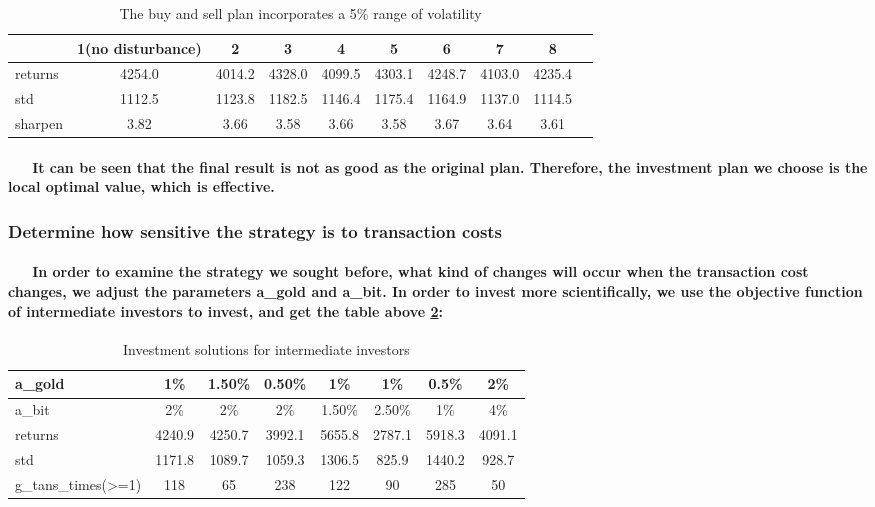\documentclass{mcmthesis}
\begin{document}
	\begin{table}[H]
		\centering
		\caption{The buy and sell plan incorporates a 5\% range of volatility}\label{t2}
		\begin{tabular}{|l|c|c|c|c|c|c|c|c|c|}
			\hline
			\  & 1(no disturbance) & 2	 &	 3 	&4		 & 			5& 		6 & 7	 & 8	 \\
			\hline
			returns & 4254.0 	& 4014.2 & 4328.0 & 4099.5 & 4303.1 &	4248.7& 4103.0 & 4235.4 \\
			\hline
			std		 & 1112.5 	& 1123.8 & 1182.5 & 1146.4 & 1175.4 & 1164.9 & 1137.0 & 1114.5 \\
			\hline
			sharpen & 3.82 	& 3.66		&3.58		&3.66	& 3.58	& 3.67	& 3.64	& 3.61	 \\
			\hline
		\end{tabular}
	\end{table}
	
	\paragraph{
		\ \ \ It can be seen that the final result is not as good as the original plan. Therefore, the investment plan we choose is the local optimal value, which is effective.
	}
	
	\subsubsection{Determine how sensitive the strategy is to transaction costs}
	
	\paragraph{
		\ \ \ In order to examine the strategy we sought before, what kind of changes will occur when the transaction cost changes, we adjust the parameters a\_gold and a\_bit. In order to invest more scientifically, we use the objective function of intermediate investors to invest, and get the table above \ref{t3}: 
	}
	
	\begin{table}[H]
		\centering
		\caption{Investment solutions for intermediate investors}\label{t3}
		\begin{tabular}{|l|c|c|c|c|c|c|c|}
			\hline
			a\_gold  & 1\% & 1.50\%	 &	0.50\% 	&1\%		&  1\% &	0.5\% & 	2\% \\
			\hline
			a\_bit 	& 2\% 	& 2\% 	& 2\%		 & 1.50\% & 2.50\% &	1\% & 4\%  \\
			\hline
			returns		 & 4240.9 	& 4250.7 & 3992.1 & 5655.8 & 2787.1 & 5918.3 & 4091.1  \\
			\hline
			std 		& 1171.8     & 1089.7 &1059.3 & 1306.5 & 825.9  & 1440.2 & 928.7 \\
			\hline
			g\_tans\_times(>=1) & 118	& 65		& 238		& 122	& 90	& 285	& 50		 \\
			\hline
		\end{tabular}
	\end{table}
	
\end{document}
